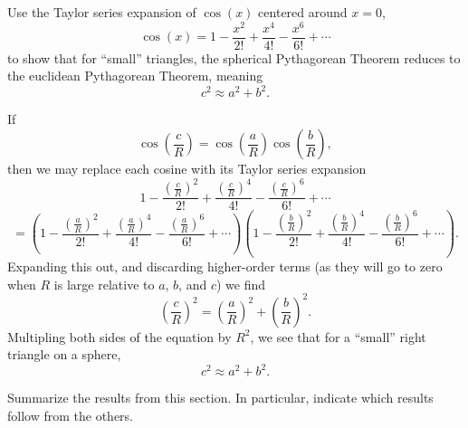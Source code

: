 \documentclass{ximera}
\begin{document}
\begin{problem}
  Use the Taylor series expansion of $\cos(x)$ centered around $x=0$,
  \[
  \cos(x) = 1 - \frac{x^2}{2!} + \frac{x^4}{4!} - \frac{x^6}{6!} + \cdots
  \]
to show that for ``small'' triangles, the spherical Pythagorean
Theorem reduces to the euclidean Pythagorean Theorem, meaning
\[
c^2 \approx a^2+b^2.
\]
\begin{freeResponse}
  If
  \[
  \cos\left(\frac{c}{R}\right)=\cos\left(\frac{a}{R}\right)\cos\left(\frac{b}{R}\right),
  \]
  then we may replace each cosine with its Taylor series expansion
  \[
  1 - \frac{\left(\frac{c}{R}\right)^2}{2!} + \frac{\left(\frac{c}{R}\right)^4}{4!} - \frac{\left(\frac{c}{R}\right)^6}{6!} + \cdots
  \]
  \[
  =\left(
  1 - \frac{\left(\frac{a}{R}\right)^2}{2!} + \frac{\left(\frac{a}{R}\right)^4}{4!} - \frac{\left(\frac{a}{R}\right)^6}{6!} + \cdots
  \right)
  \left(
  1 - \frac{\left(\frac{b}{R}\right)^2}{2!} + \frac{\left(\frac{b}{R}\right)^4}{4!} - \frac{\left(\frac{b}{R}\right)^6}{6!} + \cdots
  \right).
  \]
  Expanding this out, and discarding higher-order terms (as they will
  go to zero when $R$ is large relative to $a$, $b$, and $c$) we find
  \[
\left(\frac{c}{R}\right)^2 = \left(\frac{a}{R}\right)^2+\left(\frac{b}{R}\right)^2.
\]
Multipling both sides of the equation by $R^2$, we see that for a
``small'' right triangle on a sphere,
\[
c^2 \approx a^2 +b^2.
\]
\end{freeResponse}
\end{problem}


\begin{problem}
Summarize the results from this section. In particular, indicate which
results follow from the others.
\begin{freeResponse}
\end{freeResponse}
\end{problem}
\end{document}
